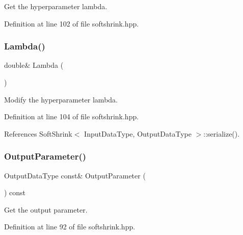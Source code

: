 Get the hyperparameter lambda. 



Definition at line 102 of file softshrink.\+hpp.

\mbox{\label{classmlpack_1_1ann_1_1SoftShrink_aaf66629b989a326453647f42443c6a0c}} 
\subsubsection{Lambda()\hspace{0.1cm}{\footnotesize\ttfamily [2/2]}}
{\footnotesize\ttfamily double\& Lambda (\begin{DoxyParamCaption}{ }\end{DoxyParamCaption})\hspace{0.3cm}{\ttfamily [inline]}}



Modify the hyperparameter lambda. 



Definition at line 104 of file softshrink.\+hpp.



References Soft\+Shrink$<$ Input\+Data\+Type, Output\+Data\+Type $>$\+::serialize().

\mbox{\label{classmlpack_1_1ann_1_1SoftShrink_a0ee21c2a36e5abad1e7a9d5dd00849f9}} 
\subsubsection{Output\+Parameter()\hspace{0.1cm}{\footnotesize\ttfamily [1/2]}}
{\footnotesize\ttfamily Output\+Data\+Type const\& Output\+Parameter (\begin{DoxyParamCaption}{ }\end{DoxyParamCaption}) const\hspace{0.3cm}{\ttfamily [inline]}}



Get the output parameter. 



Definition at line 92 of file softshrink.\+hpp.

\mbox{\label{classmlpack_1_1ann_1_1SoftShrink_a21d5f745f02c709625a4ee0907f004a5}} 
